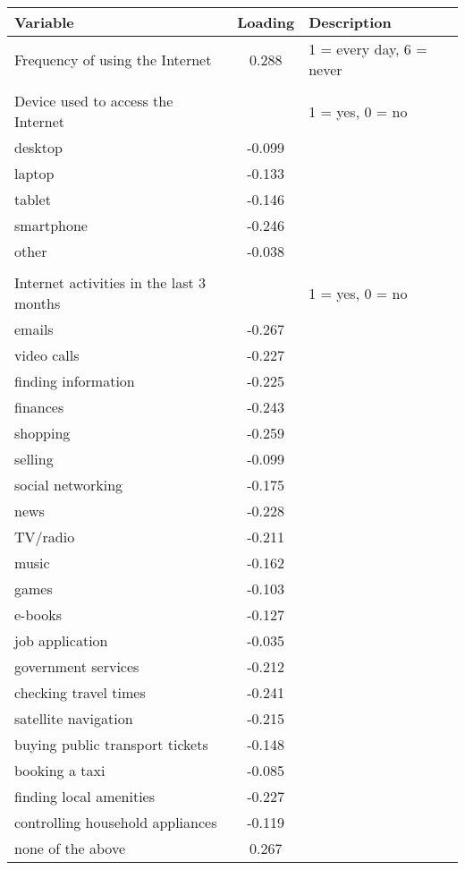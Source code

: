 \documentclass[12pt]{article}
\begin{document}
    \begin{tabular}{lcl}
        \toprule
        Variable & Loading & Description \\
        \midrule
        Frequency of using the Internet & 0.288 & 1 = every day, 6 = never \\
        & & \\
        Device used to access the Internet & & 1 = yes, 0 = no \\
        desktop & -0.099 &  \\
        laptop & -0.133 & \\
        tablet & -0.146 & \\
        smartphone & -0.246 & \\
        other & -0.038 & \\
        & & \\
        Internet activities in the last 3 months & & 1 = yes, 0 = no \\
        emails & -0.267 & \\
        video calls & -0.227 & \\
        finding information & -0.225 & \\
        finances & -0.243 & \\
        shopping & -0.259 & \\
        selling & -0.099 & \\
        social networking & -0.175 & \\
        news & -0.228 & \\
        TV/radio & -0.211 & \\
        music & -0.162 & \\
        games & -0.103 & \\
        e-books & -0.127 & \\
        job application & -0.035 & \\
        government services & -0.212 & \\
        checking travel times & -0.241 & \\
        satellite navigation & -0.215 & \\
        buying public transport tickets & -0.148 & \\
        booking a taxi & -0.085 & \\
        finding local amenities & -0.227 & \\
        controlling household appliances & -0.119 & \\
        none of the above & 0.267 & \\
        \bottomrule
    \end{tabular}
\end{document}

